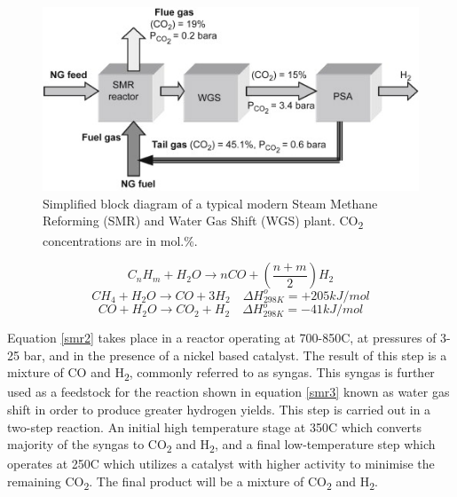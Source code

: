 \begin{figure}
    \centering
    \includegraphics{figures/smrprocess.jpg}
    \caption{Simplified block diagram of a typical modern Steam Methane Reforming (SMR) and Water Gas Shift (WGS) plant. CO\textsubscript{2} concentrations are in mol.\%. \cite{Muradov2015}}
    \label{fig:smrprocess}
\end{figure}

\begin{equation} \label{smr1}
    C_n H_m + H_2 O \rightarrow nCO +(\frac{n+m}{2})H_2 
\end{equation}
\begin{equation}\label{smr2}
    CH_4 + H_2 O \rightarrow CO + 3H_2 \quad \Delta H_{298K}^o = +205 kJ/mol
\end{equation}
\begin{equation}\label{smr3}
    CO+ H_2 O \rightarrow CO_2 + H_2 \quad \Delta H_{298K}^o = -41 kJ/mol
\end{equation}

Equation \ref{smr2} takes place in a reactor operating at 700-850\textdegree C, at pressures of 3-25 bar, and in the presence of a nickel based catalyst. \cite{Muradov2015}
The result of this step is a mixture of CO and H\textsubscript{2}, commonly referred to as syngas. 
This syngas is further used as a feedstock for the reaction shown in equation \ref{smr3} known as water gas 
shift in order to produce greater hydrogen yields.  
This step is carried out in a two-step reaction. An initial high temperature stage at 350\textdegree C which converts majority of the syngas to CO\textsubscript{2} and H\textsubscript{2}, and a final low-temperature step which operates at 250\textdegree C which utilizes a catalyst with higher activity to minimise the remaining CO\textsubscript{2}. \cite{Muradov2015}
The final product will be a mixture of CO\textsubscript{2} and H\textsubscript{2}.  

